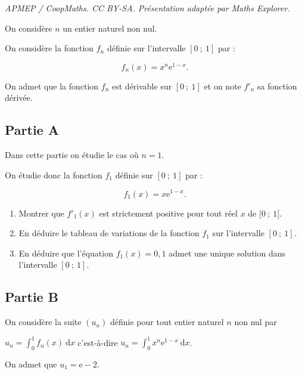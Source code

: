 \documentclass[10pt]{article}
\providecommand{\e}{{\mathrm{e}}}
\begin{document}
\noindent\textit{APMEP / CoopMaths. CC BY-SA. Présentation adaptée par Maths Explorer.}\par\medskip
On considère $n$ un entier naturel non nul.

On considère la fonction $f_n$ définie sur l’intervalle $[0~;~1]$ par :

\[f_n(x) = x^n \e^{1 - x}.\]

On admet que la fonction $f_n$ est dérivable sur $[0~;~1]$ et on note $f'_n$ sa fonction dérivée.

\subsection*{Partie A}

Dans cette partie on étudie le cas où $n = 1$.

On étudie donc la fonction $f_1$ définie sur $[0~;~1]$ par :

\[f_1(x) = x\e^{1 - x}.\]

\begin{enumerate}
\item Montrer que $f'_1(x)$ est strictement positive pour tout réel $x$ de $[0~;~1[$.
\item En déduire le tableau de variations de la fonction $f_1$ sur l'intervalle $[0~;~1]$.
\item En déduire que l'équation $f_1(x)= 0,1$ admet une unique solution dans l'intervalle $[0~;~1]$.
\end{enumerate}

\subsection*{Partie B}

On considère la suite $(u_n)$ définie pour tout entier naturel $n$ non nul par 

\begin{center}$u_n = \displaystyle\int_0^1 f_n(x) \:\text{d}x$ \quad  c'est-à-dire \quad $u_n = \displaystyle\int_0^1 x^n \e^{1-x} \: \text{d}x$.\end{center}

On admet que $u_1 = \e - 2$.

\medskip
\end{document}
